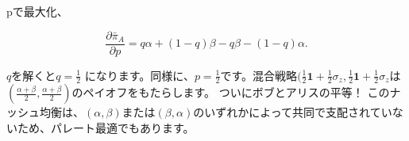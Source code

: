 pで最大化、

\begin{equation}
\label{162}
\frac{ \partial \bar{\pi}_A}{ \partial p}
= q \alpha + (1-q) \beta - q \beta - (1-q) \alpha.
\end{equation}

$q$を解くと$q = \frac{1}{2}$ になります。同様に、$p = \frac{1}{2} $です。混合戦略$ ( \frac{1}{2} \mathbf{1} + \frac{1}{2} \sigma_z, \frac{1}{2} \mathbf{1} + \frac{1}{2} \sigma_z $は$ ( \frac{\alpha + \beta }{2}, \frac{\alpha + \beta }{2} ) $のペイオフをもたらします。 ついにボブとアリスの平等！ このナッシュ均衡は、$(\alpha, \beta)$または$(\beta, \alpha)$のいずれかによって共同で支配されていないため、パレート最適でもあります。


